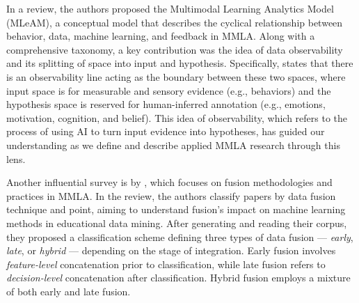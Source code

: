 \documentclass[manuscript,screen,review]{acmart}
\begin{document}
In a \citet{di_mitri_signals_2018} review, the authors proposed the Multimodal Learning Analytics Model (MLeAM), a conceptual model that describes the cyclical relationship between behavior, data, machine learning, and feedback in MMLA. Along with a comprehensive taxonomy, a key contribution was the idea of data observability and its splitting of space into input and hypothesis. Specifically, \citet{di_mitri_signals_2018} states that there is an observability line acting as the boundary between these two spaces, where input space is for measurable and sensory evidence (e.g., behaviors) and the hypothesis space is reserved for human-inferred annotation (e.g., emotions, motivation, cognition, and belief). This idea of observability, which refers to the process of using AI to turn input evidence into hypotheses, has guided our understanding as we define and describe applied MMLA research through this lens.

Another influential survey is by \citet{chango_review_nodate}, which focuses on fusion methodologies and practices in MMLA. In the review, the authors classify papers by data fusion technique and point, aiming to understand fusion's impact on machine learning methods in educational data mining. After generating and reading their corpus, they proposed a classification scheme defining three types of data fusion --- \textit{early}, \textit{late}, or \textit{hybrid} --- depending on the stage of integration. Early fusion involves \textit{feature-level} concatenation prior to classification, while late fusion refers to \textit{decision-level} concatenation after classification. Hybrid fusion employs a mixture of both early and late fusion.
\end{document}
